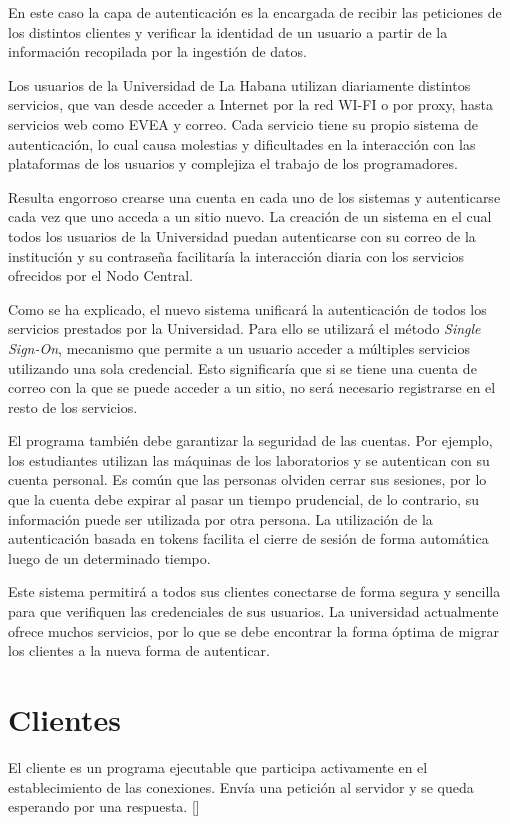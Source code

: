 En este caso la capa de autenticación es la encargada de recibir las peticiones de los distintos clientes y verificar la identidad de un usuario a partir de la información recopilada por la ingestión de datos.

Los usuarios de la Universidad de La Habana  utilizan diariamente distintos servicios, que van desde acceder a Internet por la red WI-FI o por proxy, hasta servicios web como EVEA y correo. Cada servicio tiene su propio sistema de autenticación, lo cual causa molestias y dificultades en la interacción con las plataformas de los usuarios y complejiza el trabajo de los programadores.

Resulta engorroso crearse una cuenta en cada uno de los sistemas y autenticarse cada vez que uno acceda a un sitio nuevo. La creación de un sistema en el cual todos los usuarios de la Universidad puedan autenticarse con su correo de la institución y su contraseña facilitaría la interacción diaria con los servicios ofrecidos por el Nodo Central.


Como se ha explicado, el nuevo sistema unificará la autenticación de todos los servicios prestados por la Universidad. Para ello se utilizará el método \textit{Single Sign-On}, mecanismo que permite a un usuario acceder a múltiples servicios utilizando una sola credencial. Esto significaría que si se tiene una cuenta de correo con la que se puede acceder a un sitio, no será necesario registrarse en el resto de los servicios.

El programa también debe garantizar la seguridad de las cuentas. Por ejemplo, los estudiantes utilizan las máquinas de los laboratorios y se autentican con su cuenta personal. Es común que las personas olviden cerrar sus sesiones, por lo que la cuenta debe expirar al pasar un tiempo prudencial, de lo contrario, su información puede ser utilizada por otra persona. La utilización de la autenticación basada en tokens facilita el cierre de sesión de forma automática luego de un determinado tiempo.

Este sistema permitirá a todos sus clientes conectarse de forma segura y sencilla para que verifiquen las credenciales de sus usuarios. La universidad actualmente ofrece muchos servicios, por lo que se debe encontrar la forma óptima de migrar los clientes a la nueva forma de autenticar.


\section{Clientes} \label{client-layer}
El cliente es un programa ejecutable que participa activamente en el establecimiento de las conexiones. Envía una petición al servidor y se queda esperando por una respuesta. [\cite{lizama2016redes}]

